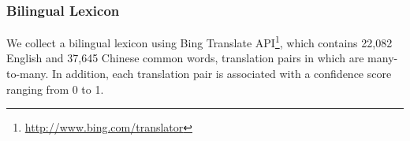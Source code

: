 \subsubsection{Bilingual Lexicon}
\label{sec:blpre}
We collect a bilingual lexicon using Bing Translate 
API\footnote{\url{http://www.bing.com/translator}}, which contains 22,082 English 
and 37,645 Chinese common words, translation pairs in which are many-to-many.
In addition, each translation pair is associated with a confidence score 
ranging from 0 to 1. 


